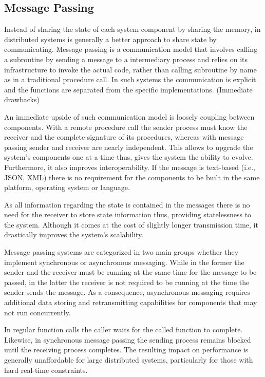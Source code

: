 \subsection{Message Passing}

Instead of sharing the state of each system component by sharing the memory, in distributed systems is generally a better approach to share state by communicating. Message passing is a communication model that involves calling a subroutine by sending a message to a intermediary process and relies on its infrastructure to invoke the actual code, rather than calling subroutine by name as in a traditional procedure call. In such systems the communication is explicit and the functions are separated from the specific implementations. (Immediate drawbacks)

An immediate upside of such communication model is loosely coupling between components. With a remote procedure call the sender process must know the receiver and the complete signature of its procedures, whereas with message passing sender and receiver are nearly independent. This allows to upgrade the system's components one at a time thus, gives the system the ability to evolve. Furthermore, it also improves interoperability. If the message is text-based (i.e., JSON, XML) there is no requirement for the components to be built in the same platform, operating system or language.

As all information regarding the state is contained in the messages there is no need for the receiver to store state information thus, providing statelessness to the system. Although it comes at the cost of slightly longer transmission time, it drastically improves the system's scalability.

Message passing systems are categorized in two main groups whether they implement synchronous or asynchronous messaging. While in the former the sender and the receiver must be running at the same time for the message to be passed, in the latter the receiver is not required to be running at the time the sender sends the message. As a consequence, asynchronous messaging requires additional data storing and retransmitting capabilities for components that may not run concurrently.

In regular function calls the caller waits for the called function to complete. Likewise, in synchronous message passing the sending process remains blocked until the receiving process completes. The resulting impact on performance is generally unaffordable for large distributed systems, particularly for those with hard real-time constraints.

